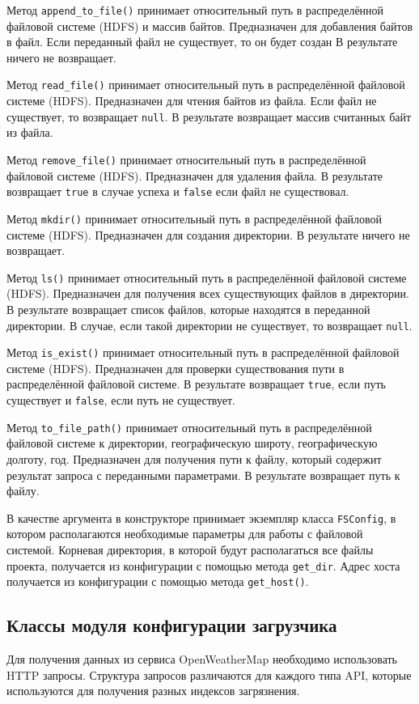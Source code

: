 Метод \texttt{append\_to\_file()} принимает относительный путь в распределённой файловой системе (HDFS) и массив байтов.
Предназначен для добавления байтов в файл.
Если переданный файл не существует, то он будет создан
В результате ничего не возвращает.

Метод \texttt{read\_file()} принимает относительный путь в распределённой файловой системе (HDFS).
Предназначен для чтения байтов из файла.
Если файл не существует, то возвращает \texttt{null}.
В результате возвращает массив считанных байт из файла.

Метод \texttt{remove\_file()} принимает относительный путь в распределённой файловой системе (HDFS).
Предназначен для удаления файла.
В результате возвращает \texttt{true} в случае успеха и \texttt{false} если файл не существовал.

Метод \texttt{mkdir()} принимает относительный путь в распределённой файловой системе (HDFS).
Предназначен для создания директории. 
В результате ничего не возвращает.

Метод \texttt{ls()} принимает относительный путь в распределённой файловой системе (HDFS).
Предназначен для получения всех существующих файлов в директории.
В результате возвращает список файлов, которые находятся в переданной директории.
В случае, если такой директории не существует, то возвращает \texttt{null}.

Метод \texttt{is\_exist()} принимает относительный путь в распределённой файловой системе (HDFS).
Предназначен для проверки существования пути в распределённой файловой системе.
В результате возвращает \texttt{true}, если путь существует и \texttt{false}, если путь не существует.

Метод \texttt{to\_file\_path()} принимает относительный путь в распределённой файловой системе к директории, географическую широту, географическую долготу, год.
Предназначен для получения пути к файлу, который содержит результат запроса с переданными параметрами.
В результате возвращает путь к файлу.


В качестве аргумента в конструкторе принимает экземпляр класса \texttt{FSConfig}, в котором располагаются необходимые параметры для работы с файловой системой.
Корневая директория, в которой будут располагаться все файлы проекта, получается из конфигурации с помощью метода \texttt{get\_dir}.
Адрес хоста получается из конфигурации с помощью метода \texttt{get\_host()}.

\subsection{Классы модуля конфигурации загрузчика}
Для получения данных из сервиса OpenWeatherMap необходимо использовать HTTP запросы.
Структура запросов различаются для каждого типа API, которые используются для получения разных индексов загрязнения.


